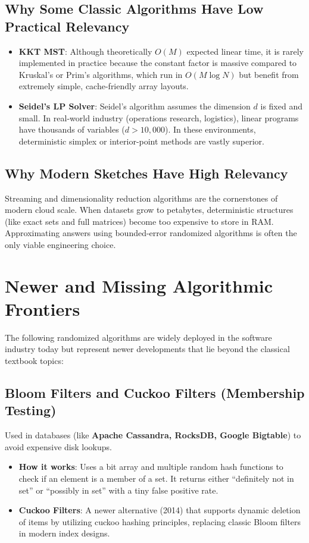 \documentclass[twoside,12pt]{book}
\theoremstyle{plain}
\theoremstyle{definition}
\theoremstyle{remark}
\begin{document}
\subsection{Why Some Classic Algorithms Have Low Practical Relevancy}
\begin{itemize}
    \item \textbf{KKT MST}: Although theoretically $O(M)$ expected linear time, it is rarely implemented in practice because the constant factor is massive compared to Kruskal's or Prim's algorithms, which run in $O(M \log N)$ but benefit from extremely simple, cache-friendly array layouts.
    \item \textbf{Seidel's LP Solver}: Seidel's algorithm assumes the dimension $d$ is fixed and small. In real-world industry (operations research, logistics), linear programs have thousands of variables ($d > 10,000$). In these environments, deterministic simplex or interior-point methods are vastly superior.
\end{itemize}

\subsection{Why Modern Sketches Have High Relevancy}
Streaming and dimensionality reduction algorithms are the cornerstones of modern cloud scale. When datasets grow to petabytes, deterministic structures (like exact sets and full matrices) become too expensive to store in RAM. Approximating answers using bounded-error randomized algorithms is often the only viable engineering choice.

\section{Newer and Missing Algorithmic Frontiers}

The following randomized algorithms are widely deployed in the software industry today but represent newer developments that lie beyond the classical textbook topics:

\subsection{Bloom Filters and Cuckoo Filters (Membership Testing)}
Used in databases (like \textbf{Apache Cassandra, RocksDB, Google Bigtable}) to avoid expensive disk lookups. 
\begin{itemize}
    \item \textbf{How it works}: Uses a bit array and multiple random hash functions to check if an element is a member of a set. It returns either ``definitely not in set'' or ``possibly in set'' with a tiny false positive rate.
    \item \textbf{Cuckoo Filters}: A newer alternative (2014) that supports dynamic deletion of items by utilizing cuckoo hashing principles, replacing classic Bloom filters in modern index designs.
\end{itemize}
\end{document}
